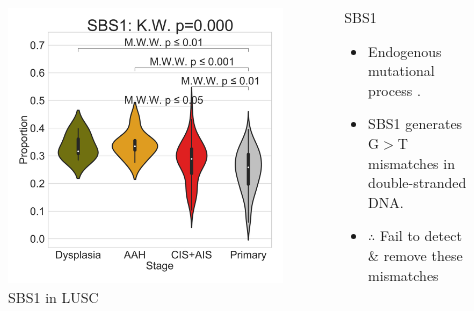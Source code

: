 \documentclass{beamer}
\begin{document}
\begin{frame}[allowframebreaks]
                    \begin{columns}
                        \begin{column}{0.4 \textwidth}
                            \begin{figure}
                                \includegraphics[width=\linewidth]{figures/SigProfiler/BWA-Violin/COSMIC-SingleBase.SQC.Subtype.Relative/SBS1.pdf}
                                \caption{SBS1 in LUSC}
                            \end{figure}
                        \end{column}
                        \begin{column}{0.55 \textwidth}
                            \begin{block}{SBS1}
                                \begin{itemize}
                                    \item Endogenous mutational process \cite{signature-01}.
                                    \item SBS1 generates G$>$T mismatches in double-stranded DNA.
                                    \item $\therefore$ Fail to detect \& remove these mismatches
                                \end{itemize}
                            \end{block}
                        \end{column}
                    \end{columns}


\end{frame}
\end{document}
